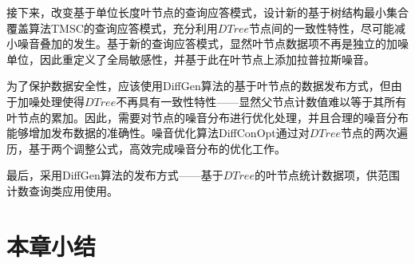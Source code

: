 接下来，改变基于单位长度叶节点的查询应答模式，设计新的基于树结构最小集合覆盖算法TMSC的查询应答模式，充分利用$DTree$节点间的一致性特性，尽可能减小噪音叠加的发生。基于新的查询应答模式，显然叶节点数据项不再是独立的加噪单位，因此重定义了全局敏感性，并基于此在叶节点上添加拉普拉斯噪音。

为了保护数据安全性，应该使用DiffGen算法的基于叶节点的数据发布方式，但由于加噪处理使得$DTree$不再具有一致性特性——显然父节点计数值难以等于其所有叶节点的累加。因此，需要对节点的噪音分布进行优化处理，并且合理的噪音分布能够增加发布数据的准确性。噪音优化算法DiffConOpt通过对$DTree$节点的两次遍历，基于两个调整公式，高效完成噪音分布的优化工作。

最后，采用DiffGen算法的发布方式——基于$DTree$的叶节点统计数据项，供范围计数查询类应用使用。


\section{本章小结}